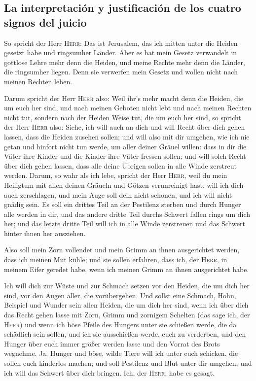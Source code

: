 \hypertarget{la-interpretaciuxf3n-y-justificaciuxf3n-de-los-cuatro-signos-del-juicio}{%
\subsection{La interpretación y justificación de los cuatro signos del
juicio}\label{la-interpretaciuxf3n-y-justificaciuxf3n-de-los-cuatro-signos-del-juicio}}

 So spricht der Herr \textsc{Herr}: Das ist Jerusalem, das
ich mitten unter die Heiden gesetzt habe und ringsumher Länder.
 Aber es hat mein Gesetz verwandelt in gottlose Lehre mehr
denn die Heiden, und meine Rechte mehr denn die Länder, die ringsumher
liegen. Denn sie verwerfen mein Gesetz und wollen nicht nach meinen
Rechten leben.

 Darum spricht der Herr \textsc{Herr} also: Weil ihr's
mehr macht denn die Heiden, die um euch her sind, und nach meinen
Geboten nicht lebt und nach meinen Rechten nicht tut, sondern nach der
Heiden Weise tut, die um euch her sind,  so spricht der
Herr \textsc{Herr} also: Siehe, ich will auch an dich und will Recht
über dich gehen lassen, dass die Heiden zusehen sollen; 
und will also mit dir umgehen, wie ich nie getan und hinfort nicht tun
werde, um aller deiner Gräuel willen:  dass in dir die
Väter ihre Kinder und die Kinder ihre Väter fressen sollen; und will
solch Recht über dich gehen lassen, dass alle deine Übrigen sollen in
alle Winde zerstreut werden.  Darum, so wahr als ich
lebe, spricht der Herr \textsc{Herr}, weil du mein Heiligtum mit allen
deinen Gräueln und Götzen verunreinigt hast, will ich dich auch
zerschlagen, und mein Auge soll dein nicht schonen, und ich will nicht
gnädig sein.  Es soll ein drittes Teil an der Pestilenz
sterben und durch Hunger alle werden in dir, und das andere dritte Teil
durchs Schwert fallen rings um dich her; und das letzte dritte Teil will
ich in alle Winde zerstreuen und das Schwert hinter ihnen her ausziehen.

 Also soll mein Zorn vollendet und mein Grimm an ihnen
ausgerichtet werden, dass ich meinen Mut kühle; und sie sollen erfahren,
dass ich, der \textsc{Herr}, in meinem Eifer geredet habe, wenn ich
meinen Grimm an ihnen ausgerichtet habe.

 Ich will dich zur Wüste und zur Schmach setzen vor den
Heiden, die um dich her sind, vor den Augen aller, die vorübergehen.
 Und sollst eine Schmach, Hohn, Beispiel und Wunder sein
allen Heiden, die um dich her sind, wenn ich über dich das Recht gehen
lasse mit Zorn, Grimm und zornigem Schelten (das sage ich, der
\textsc{Herr})  und wenn ich böse Pfeile des Hungers
unter sie schießen werde, die da schädlich sein sollen, und ich sie
ausschießen werde, euch zu verderben, und den Hunger über euch immer
größer werden lasse und den Vorrat des Brots wegnehme. 
Ja, Hunger und böse, wilde Tiere will ich unter euch schicken, die
sollen euch kinderlos machen; und soll Pestilenz und Blut unter dir
umgehen, und ich will das Schwert über dich bringen. Ich, der
\textsc{Herr}, habe es gesagt.

